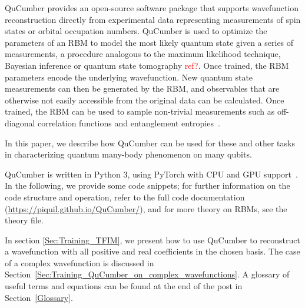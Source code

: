 \documentclass[submission, Phys]{SciPost}
\begin{document}
QuCumber provides an open-source software package that supports wavefunction reconstruction directly from experimental data representing measurements of spin states or orbital occupation numbers.
QuCumber is used to optimize the parameters of an RBM to model the most likely quantum state given a series of measurements,
a procedure analogous to the maximum likelihood technique, Bayesian inference or quantum state tomography \textcolor{red}{ref?}. 
Once trained, the RBM parameters encode the underlying wavefunction.
New quantum state measurements can then be generated by the RBM, 
and observables that are otherwise not easily accessible from the original data can be calculated. 
Once trained, the RBM can be used to sample non-trivial measurements 
such as off-diagonal correlation functions and entanglement entropies~\cite{Torlai2016thermo, torlai2018tomography}.

In this paper, we describe how QuCumber can be used for these and other tasks 
in characterizing quantum many-body phenomenon on many qubits.

QuCumber is written in Python 3, using PyTorch with CPU and GPU support~\cite{paszke2017automatic}.
In the following, we provide some code snippets; for further information on the code structure and operation, 
refer to the full code documentation (\url{https://piquil.github.io/QuCumber/}),
and for more theory on RBMs, see the theory file.

In section \ref{Sec:Training_TFIM}, we present how to use QuCumber to reconstruct a wavefunction 
with all positive and real coefficients in the chosen basis.
The case of a complex wavefunction is discussed in Section~\ref{Sec:Training_QuCumber_on_complex_wavefunctions}. 
A glossary of useful terms and equations can be found at the end of the post in Section~\ref{Glossary}.



\end{document}
